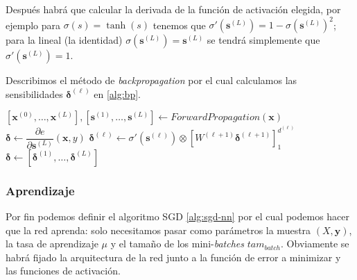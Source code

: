 Después habrá que calcular la derivada de la función de activación elegida, por ejemplo para $\sigma(s) = \tanh(s)$ tenemos que $\sigma'(\textbf{s}^{(L)}) = 1 - \sigma(\textbf{s}^{(L)})^2$; para la lineal (la identidad) $\sigma(\textbf{s}^{(L)}) = \textbf{s}^{(L)}$ se tendrá simplemente que $\sigma'(\textbf{s}^{(L)}) = 1$.

Describimos el método de \emph{backpropagation} por el cual calculamos las sensibilidades $\pmb{\delta}^{(\ell)}$ en \autoref{alg:bp}.

\begin{algorithm}[htbp]
\SetAlgoLined
 $\left[\textbf{x}^{(0)}, \ldots, \textbf{x}^{(L)}\right], \left[\textbf{s}^{(1)}, \ldots, \textbf{s}^{(L)}\right] \gets ForwardPropagation(\textbf{x})$\;
 $\pmb{\delta} \gets \dfrac{\partial e}{\partial \textbf{s}^{(L)}}(\textbf{x}, y)$\;
  {
  $\pmb{\delta}^{(\ell)} \gets \sigma'(\textbf{s}^{(\ell)}) \otimes \left[W^{(\ell + 1)}\pmb{\delta}^{(\ell + 1)}\right]^{d^{(\ell)}}_1$
 }
 $\pmb{\delta} \gets \left[\pmb{\delta}^{(1)}, \ldots, \pmb{\delta}^{(L)}\right]$\;
 \KwResult{$\pmb{\delta}$}
 \caption{$BackPropagation(\textbf{x}, y)$}
 \label{alg:bp}
\end{algorithm}

\subsubsection{Aprendizaje}

Por fin podemos definir el algoritmo SGD \autoref{alg:sgd-nn} por el cual podemos hacer que la red aprenda: solo necesitamos pasar como parámetros la muestra $(X, \textbf{y})$, la tasa de aprendizaje $\mu$ y el tamaño de los mini-\emph{batches} $tam_{batch}$. Obviamente se habrá fijado la arquitectura de la red junto a la función de error a minimizar y las funciones de activación.

